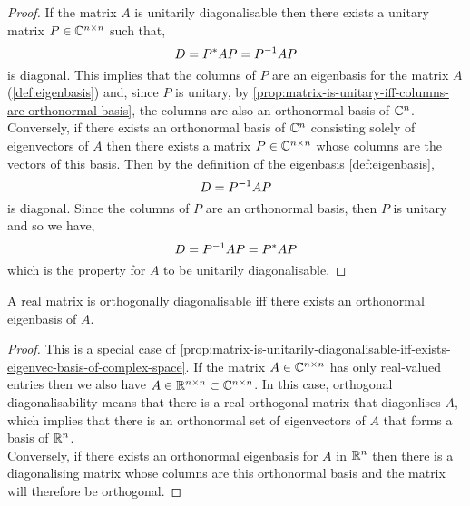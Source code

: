 \documentclass[../MathsNotesBase.tex]{subfiles}
\begin{document}
{		
		\bigskip
		\begin{proof}
			If the matrix $A$ is unitarily diagonalisable then there exists a unitary matrix ${ P \in \mathbb{C}^{n \times n} }$ such that,
			\[ D = P^* A P = {P}^{-1} A P \]
			is diagonal. This implies that the columns of $P$ are an eigenbasis for the matrix $A$ (\ref{def:eigenbasis}) and, since $P$ is unitary, by \autoref{prop:matrix-is-unitary-iff-columns-are-orthonormal-basis}, the columns are also an orthonormal basis of $\mathbb{C}^{n}$.\\
			
			Conversely, if there exists an orthonormal basis of $\mathbb{C}^{n}$ consisting solely of eigenvectors of $A$ then there exists a matrix ${ P \in \mathbb{C}^{n \times n} }$ whose columns are the vectors of this basis. Then by the definition of the eigenbasis \ref{def:eigenbasis},
			\[ D = {P}^{-1} A P \]
			is diagonal. Since the columns of $P$ are an orthonormal basis, then $P$ is unitary and so we have,
			\[ D = {P}^{-1} A P = P^* A P \]
			which is the property for $A$ to be unitarily diagonalisable.
		\end{proof}
		\begin{corollary}
			A real matrix is orthogonally diagonalisable iff there exists an orthonormal eigenbasis of $A$.
		\end{corollary}
		\begin{proof}
			This is a special case of \autoref{prop:matrix-is-unitarily-diagonalisable-iff-exists-eigenvec-basis-of-complex-space}. If the matrix ${ A \in \mathbb{C}^{n \times n} }$ has only real-valued entries then we also have ${ A \in \mathbb{R}^{n \times n} \subset \mathbb{C}^{n \times n} }$. In this case, orthogonal diagonalisability means that there is a real orthogonal matrix that diagonlises $A$, which implies that there is an orthonormal set of eigenvectors of $A$ that forms a basis of $\mathbb{R}^{n}$.\\
			Conversely, if there exists an orthonormal eigenbasis for $A$ in $\mathbb{R}^{n}$ then there is a diagonalising matrix whose columns are this orthonormal basis and the matrix will therefore be orthogonal.
		\end{proof}
	
	
	
}
\end{document}

